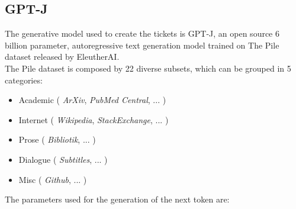 \documentclass{article}
\begin{document}
\subsection{GPT-J}
The generative model used to create the tickets is GPT-J, an open source 6 billion parameter, autoregressive text generation model trained on The Pile dataset released by EleutherAI. \\
The Pile dataset is composed by 22 diverse subsets, which can be grouped in 5 categories:
\begin{itemize}
    \item Academic ( \textit{ArXiv}, \textit{PubMed Central}, ... )
    \item Internet ( \textit{Wikipedia}, \textit{StackExchange}, ... )
    \item Prose ( \textit{Bibliotik}, ... )
    \item Dialogue ( \textit{Subtitles}, ... )
    \item Misc ( \textit{Github}, ... )
\end{itemize}
\vspace{0.5cm}
The parameters used for the generation of the next token are:
\end{document}
